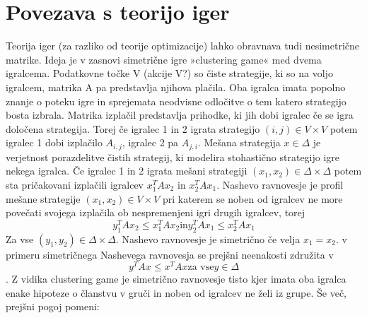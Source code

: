 \documentclass[a4paper]{article}
\begin{document}
\section{Povezava s teorijo iger}
Teorija iger (za razliko od teorije optimizacije) lahko obravnava tudi nesimetrične matrike. Ideja je v zasnovi simetrične igre »clustering game« med dvema igralcema. Podatkovne točke V (akcije V?) so čiste strategije, ki so na voljo igralcem, matrika A pa predstavlja njihova plačila. Oba igralca imata popolno znanje o poteku igre in sprejemata neodvisne odločitve o tem katero strategijo bosta izbrala. Matrika izplačil predstavlja prihodke, ki jih dobi igralec če se igra določena strategija. Torej če igralec 1 in 2 igrata strategijo $(i,j)\in V\times V$ potem igralec 1 dobi izplačilo $A_{i,j}$, igralec 2 pa $A_{j,i}$.
Mešana strategija $x\in\Delta$ je verjetnost porazdelitve čistih strategij, ki modelira stohastično strategijo igre nekega igralca. Če igralec 1 in 2 igrata mešani strategiji $(x_1,x_2)\in\Delta\times\Delta$  potem sta pričakovani izplačili igralcev $x_1^TAx_2$ in $x_2^TAx_1$.
Nashevo ravnovesje je profil mešane strategije $(x_1,x_2)\in V\times V$ pri katerem se noben od igralcev ne more povečati svojega izplačila ob nespremenjeni igri drugih igralcev, torej 
$$y_1^TAx_2\leq x_1^TAx_2 \text{in} y_2^TAx_1\leq x_2^TAx_1$$
Za vse $(y_1,y_2)\in\Delta\times\Delta$. Nashevo ravnovesje je simetrično če velja $x_1=x_2$. v primeru simetričnega Nashevega ravnovesja se prejšni neenakosti združita v
$$y^TAx\leq x^TAx \text{za vse} y\in\Delta$$.
Z vidika clustering game je simetrično ravnovesje tisto kjer imata oba igralca enake hipoteze o članstvu v gruči in noben od igralcev ne želi iz grupe. Še več, prejšni pogoj pomeni:
\end{document}
